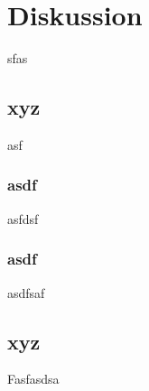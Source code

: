 \chapter{Diskussion}


sfas



\section{xyz}

asf


\subsection{asdf}

asfdsf

\subsection{asdf}

asdfsaf



\section{xyz}

Fasfasdsa


